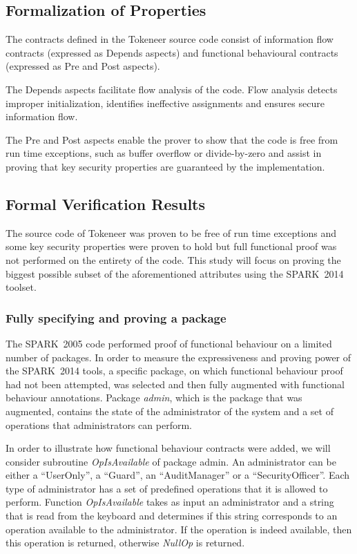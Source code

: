 \documentclass[10pt,a4paper,twocolumn]{article}
\newcommand{\oldspark}{SPARK~2005\xspace}
\newcommand{\newspark}{SPARK~2014\xspace}
\begin{document}
\subsection{Formalization of Properties}

The contracts defined in the Tokeneer source code consist of
information flow contracts (expressed as Depends aspects) and
functional behavioural contracts (expressed as Pre and Post aspects).

The Depends aspects facilitate flow analysis of the code. Flow
analysis detects improper initialization, identifies ineffective
assignments and ensures secure information flow.

The Pre and Post aspects enable the prover to show that the code is
free from run time exceptions, such as buffer overflow or
divide-by-zero and assist in proving that key security properties are
guaranteed by the implementation.

\subsection{Formal Verification Results}

The source code of Tokeneer was proven to be free of run time
exceptions and some key security properties were proven to hold but
full functional proof was not performed on the entirety of the
code. This study will focus on proving the biggest possible subset of
the aforementioned attributes using the \newspark toolset.

\subsubsection{Fully specifying and proving a package}

The \oldspark code performed proof of functional behaviour on a
limited number of packages. In order to measure the expressiveness and
proving power of the \newspark tools, a specific package, on which
functional behaviour proof had not been attempted, was selected and
then fully augmented with functional behaviour annotations. Package
\emph{admin}, which is the package that was augmented, contains the
state of the administrator of the system and a set of operations that
administrators can perform.

In order to illustrate how functional behaviour contracts were added,
we will consider subroutine \emph{OpIsAvailable} of package admin. An
administrator can be either a ``UserOnly'', a ``Guard'', an
``AuditManager'' or a ``SecurityOfficer''. Each type of administrator
has a set of predefined operations that it is allowed to
perform. Function \emph{OpIsAvailable} takes as input an administrator
and a string that is read from the keyboard and determines if this
string corresponds to an operation available to the administrator. If
the operation is indeed available, then this operation is returned,
otherwise \emph{NullOp} is returned.
\end{document}
